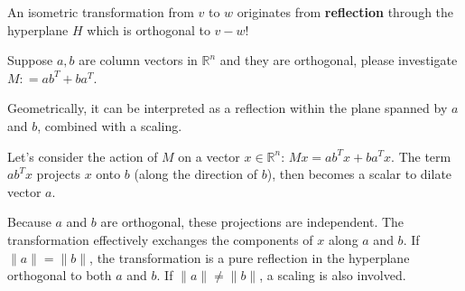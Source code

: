\documentclass[dvipsnames, 12pt]{article}
\begin{document}
An isometric transformation from $v$ to $w$ originates from \textbf{reflection} through the hyperplane $H$ which is orthogonal to $v-w$!

\begin{problem}{}
    Suppose $a, b$ are column vectors in $\mathbb{R}^n$ and they are orthogonal, please investigate $M: = ab^{T} + ba^{T}$.
\end{problem}

Geometrically, it can be interpreted as a reflection within the plane spanned by $a$ and $b$, combined with a scaling.

Let's consider the action of $M$ on a vector $x \in \mathbb{R}^n$: $Mx = ab^Tx + ba^Tx$.  The term $ab^Tx$ projects $x$ onto $b$ (along the direction of $b$), then becomes a scalar to dilate vector $a$. 

Because $a$ and $b$ are orthogonal, these projections are independent. The transformation effectively exchanges the components of $x$ along $a$ and $b$. If $\|a\| = \|b\|$, the transformation is a pure reflection in the hyperplane orthogonal to both $a$ and $b$.  If $\|a\| \neq \|b\|$, a scaling is also involved.
\end{document}
